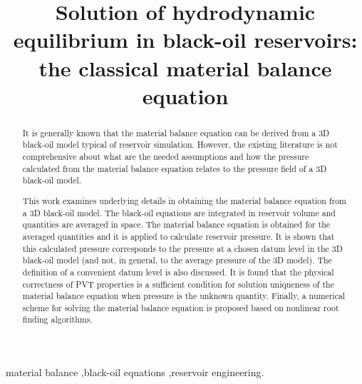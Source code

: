 \documentclass[final,authoryear,5p,twocolumn,10pt]{elsarticle}
\begin{document}
\begin{frontmatter}
\title{Solution of hydrodynamic equilibrium in black-oil reservoirs: the classical material balance equation}

%



\begin{abstract}
It is generally known that the material balance equation can be derived from a 3D black-oil model typical of reservoir simulation. However, the existing literature is not comprehensive about what are the needed assumptions and how the pressure calculated from the material balance equation relates to the pressure field of a 3D black-oil model.

This work examines underlying details in obtaining the material balance equation from a 3D black-oil model. The black-oil equations are integrated in reservoir volume and quantities are averaged in space. The material balance equation is obtained for the averaged quantities and it is applied to calculate reservoir pressure. It is shown that this calculated pressure corresponds to the pressure at a chosen datum level in the 3D black-oil model (and not, in general, to the average pressure of the 3D model). The definition of a convenient datum level is also discussed. It is found that the physical correctness of PVT properties 
is a sufficient condition for solution uniqueness of the material balance equation when pressure is the unknown quantity.
Finally, a numerical scheme for solving the material balance equation is proposed based on nonlinear root finding algorithms.
\end{abstract}

\begin{keyword}
material balance \sep black-oil equations \sep reservoir engineering.
\end{keyword}
\end{frontmatter}
\end{document}
